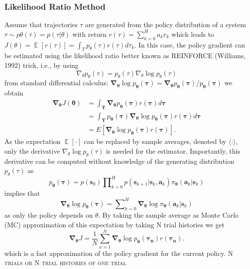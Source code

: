 \documentclass[11pt]{article}
\DeclareMathOperator{\E}{\mathbb{E}}
\begin{document}
\subsubsection{Likelihood Ratio Method}
Assume that trajectories $\tau$ are generated from the policy distribution of a system $\tau \sim p\theta(\tau)=p(\tau|\theta)$ with return $r(\tau)=\sum^H_{k=0}a_k r_k$ which leads to $J(\theta)=\E\left[r(\tau)\right]=\int_T p_\theta(\tau)r(\tau)d\tau_k$. In this case, the policy gradient can be estimated using the likelihood ratio better known as REINFORCE (Williams, 1992) trick, i.e., by using
\[
\nabla_\theta p_\theta(\tau)=p_\theta(\tau)\nabla_\theta \log p_\theta(\tau)
\]
from standard differential calculus: $\mathbf{\nabla}_{\mathbf{\theta}}\log p_{\mathbf{\theta}}\left(\mathbf{\tau}\right)
=\mathbf{\nabla}_{\mathbf{\theta}}p_{\mathbf{\theta}}\left(\mathbf{\tau}\right)/p_{\mathbf{\theta}}\left(\mathbf{\tau}\right)$  
we obtain
\begin{align*}
\mathbf{\nabla}_{\mathbf{\theta}}J\left(\mathbf{\theta}\right)&=\int_{\mathbf{T}}\mathbf{\nabla}_{\mathbf{\theta}}p_{\mathbf{\theta}}\left(\mathbf{\tau}\right)r(\mathbf{\tau})d\mathbf{\tau}\\
&=\int_{\mathbf{T}}p_{\mathbf{\theta}}\left(\mathbf{\tau}\right)\mathbf{\nabla}_{\mathbf{\theta}}\log p_{\mathbf{\theta}}\left(\mathbf{\tau}\right)r(\mathbf{\tau})d\mathbf{\tau}\\
&=E\left[\mathbf{\nabla}_{\mathbf{\theta}}\log p_{\mathbf{\theta}}\left(\mathbf{\tau}\right)r(\mathbf{\tau})\right].
\end{align*}
As the expectation $\E\left[\cdot\right]$ can be replaced by sample averages, denoted by $\langle \cdot \rangle$, only the derivative $\nabla_\theta \log p_\theta(\tau)$ is needed for the estimator. Importantly, this derivative can be computed without knowledge of the generating distribution $p_\theta(\tau)$ as
\[
p_{\mathbf{\theta}}\left(  \mathbf{\tau}\right)=p(\mathbf{s}_{0})\prod\nolimits_{k=0}
^{H}p\left(  \mathbf{s}_{k+1}\left\vert \mathbf{s}_{k},\mathbf{a}_{k}\right.
\right)  \pi_{\mathbf{\theta}}\left(  \mathbf{a}_{k}\left\vert \mathbf{s}
_{k}\right.  \right)
\]
implies that
\[
\mathbf{\nabla}_{\mathbf{\theta}}\log p_{\mathbf{\theta}}\left(  \mathbf{\tau
}\right)  =\sum\nolimits_{k=0}^{H}\mathbf{\nabla}_{\mathbf{\theta}}\log
\pi_{\mathbf{\theta}}\left(  \mathbf{a}_{k}\left\vert \mathbf{s}_{k}\right.
\right)
\]
as only the policy depends on $\theta$.
By taking the sample average as Monte Carlo (MC) approximation of this expectation by taking N trial histories we get
\[
\mathbf{\nabla}_{\mathbf{\theta}}J=\frac{1}{N}\sum_{n=1}^N \mathbf{\nabla}_{\mathbf{\theta}}\log p_{\mathbf{\theta}}\left(\mathbf{\tau_n}\right)r(\mathbf{\tau_n}).
\]
which is a fast approximation of the policy gradient for the current policy.
\textsc{N trials or N trial histories of one trial}
\end{document}
